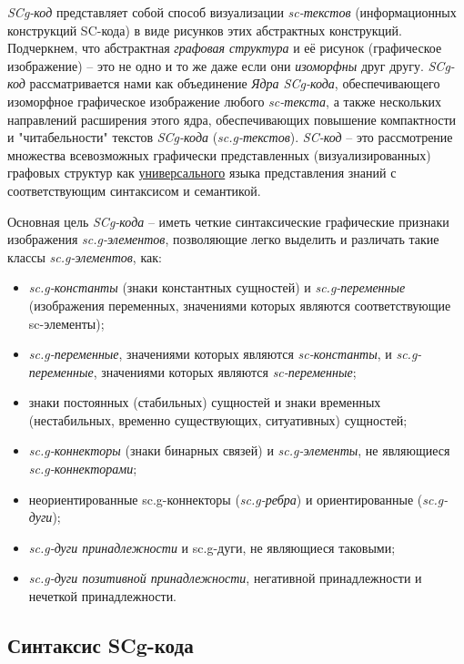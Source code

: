 \textit{SCg-код} представляет собой способ визуализации \textit{sc-текстов} (информационных конструкций SC-кода) в виде рисунков этих абстрактных конструкций. Подчеркнем, что абстрактная \textit{графовая структура} и её рисунок (графическое изображение) -- это не одно и то же даже если они \textit{изоморфны} друг другу. \mbox{\textit{SCg-код}} рассматривается нами как объединение \textit{Ядра SCg-кода}, обеспечивающего изоморфное графическое изображение любого \textit{sc-текста}, а также нескольких направлений расширения этого ядра, обеспечивающих повышение компактности и "читабельности"{} текстов \textit{SCg-кода} (\textit{sc.g-текстов}).
\textit{SC-код} -- это рассмотрение множества всевозможных графически представленных (визуализированных) графовых структур как \underline{универсального} языка представления знаний с соответствующим синтаксисом и семантикой.

Основная цель \textit{SCg-кода} – иметь четкие синтаксические графические признаки изображения \textit{sc.g-элементов}, позволяющие легко выделить и различать такие классы \textit{sc.g-элементов}, как:
\begin{itemize}
	\item \textit{sc.g-константы} (знаки константных сущностей) и \textit{sc.g-переменные} (изображения переменных, значениями которых являются соответствующие sc-элементы);
	\item \textit{sc.g-переменные}, значениями которых являются \textit{sc-константы}, и \textit{sc.g-переменные}, значениями которых являются \textit{sc-переменные};
	\item знаки постоянных (стабильных) сущностей и знаки временных (нестабильных, временно существующих, ситуативных) сущностей;
	\item \textit{sc.g-коннекторы} (знаки бинарных связей) и \textit{sc.g-элементы}, не являющиеся \textit{sc.g-коннекторами};
	\item неориентированные sc.g-коннекторы (\textit{sc.g-ребра}) и ориентированные (\textit{sc.g-дуги});
	\item \textit{sc.g-дуги принадлежности} и sc.g-дуги, не являющиеся таковыми;
	\item \textit{sc.g-дуги позитивной принадлежности}, негативной принадлежности и нечеткой принадлежности.
\end{itemize}


\subsection{Синтаксис SCg-кода}

